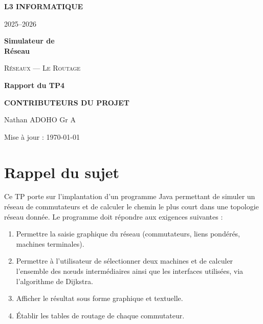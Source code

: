 \documentclass[12pt, a4paper]{article}
\begin{document}
\begin{titlepage}
\centering
\vspace*{1cm}

\large
\textbf{L3 INFORMATIQUE}

\vspace{0.3cm}
\normalsize
2025--2026

\vspace{2.5cm}

\huge
\textbf{Simulateur de\\Réseau}

\vspace{0.8cm}

\Large
\textsc{Réseaux --- Le Routage}

\vspace{1.5cm}

\LARGE
\textbf{Rapport du TP4}

\vspace{3cm}

\large
\textbf{CONTRIBUTEURS DU PROJET}

\normalsize
Nathan ADOHO \quad Gr A

\vspace{1.5cm}

\normalsize
Mise à jour : \today

\vfill

\end{titlepage}

\newpage

\tableofcontents
\newpage

\section{Rappel du sujet}

Ce TP porte sur l'implantation d'un programme Java permettant de simuler un réseau de commutateurs et de calculer le chemin le plus court dans une topologie réseau donnée. Le programme doit répondre aux exigences suivantes :

\begin{enumerate}
    \item Permettre la saisie graphique du réseau (commutateurs, liens pondérés, machines terminales).
    \item Permettre à l'utilisateur de sélectionner deux machines et de calculer l'ensemble des nœuds intermédiaires ainsi que les interfaces utilisées, via l'algorithme de Dijkstra.
    \item Afficher le résultat sous forme graphique et textuelle.
    \item Établir les tables de routage de chaque commutateur.
\end{enumerate}
\end{document}
